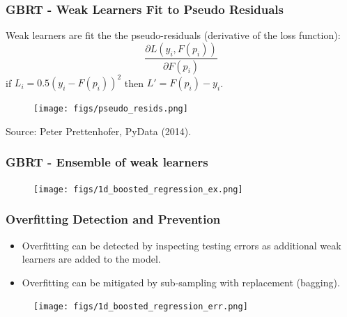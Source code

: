 \documentclass[t, pdftex]{beamer}
\begin{document}
\begin{frame}
\frametitle{GBRT - Weak Learners Fit to Pseudo Residuals}
Weak learners are fit the the pseudo-residuals (derivative of the loss function): 
\[
\frac{\partial L(y_i, F(p_i))}{\partial F(p_i)}
\]
if $L_i=0.5(y_i-F(p_i))^2$ then $L' = F(p_i)-y_i$.  
\begin{figure}[!htbp]
\centering
\texttt{[image: figs/pseudo\_resids.png]}
\label{model_overview}
\end{figure}
Source: Peter Prettenhofer, PyData (2014).
\end{frame}

\begin{frame}
\frametitle{GBRT - Ensemble of weak learners}

\begin{figure}[!htbp]
\centering
\texttt{[image: figs/1d\_boosted\_regression\_ex.png]}
\label{model_overview}
\end{figure}
\end{frame}

\begin{frame}[shrink=10]
\frametitle{Overfitting Detection and Prevention}
\begin{itemize}
\item Overfitting can be detected by inspecting testing errors as additional weak learners are added to the model.
\item Overfitting can be mitigated by sub-sampling with replacement (bagging).
\end{itemize}
\begin{figure}[!htbp]
\centering
\texttt{[image: figs/1d\_boosted\_regression\_err.png]}
\label{model_overview}
\end{figure}
\end{frame}
\end{document}
